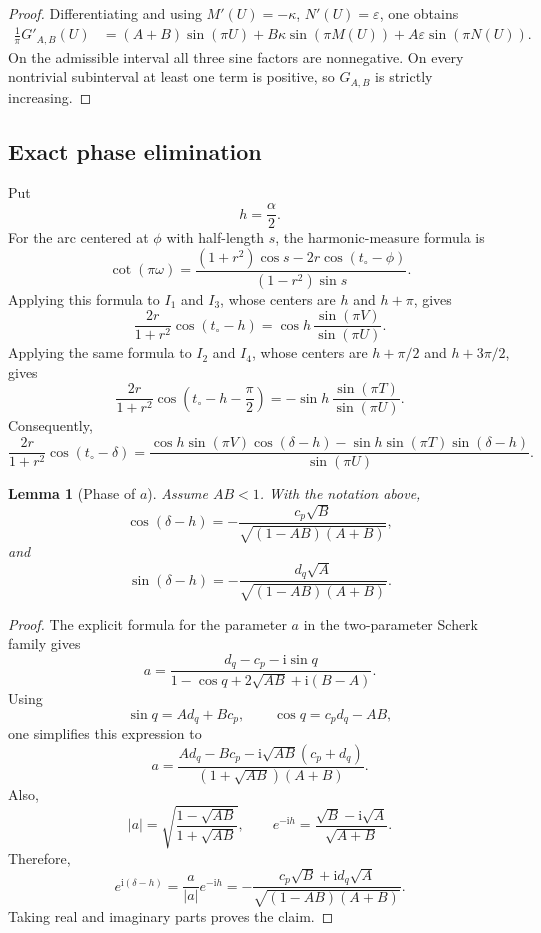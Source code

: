 \documentclass[11pt]{amsart}
\newtheorem{lemma}[theorem]{Lemma}
\theoremstyle{remark}
\newcommand{\ii}{\mathrm i}
\newcommand{\eps}{\varepsilon}
\numberwithin{equation}{section}
\begin{document}
\begin{proof}
Differentiating and using $M'(U)=-\kappa$, $N'(U)=\eps$, one obtains
\[
\begin{aligned}
        \frac1\pi G'_{A,B}(U)
        &=(A+B)\sin(\pi U)
        +B\kappa\sin(\pi M(U))
        +A\eps\sin(\pi N(U)).
\end{aligned}
\]
On the admissible interval all three sine factors are nonnegative. On every nontrivial subinterval at least one term is positive, so $G_{A,B}$ is strictly increasing.
\end{proof}

\subsection{Exact phase elimination}

Put
\[
        h=\frac{\alpha}{2}.
\]
For the arc centered at $\phi$ with half-length $s$, the harmonic-measure formula is
\[
        \cot(\pi\omega)
        =\frac{(1+r^2)\cos s-2r\cos(t_\circ-\phi)}{(1-r^2)\sin s}.
\]
Applying this formula to $I_1$ and $I_3$, whose centers are $h$ and $h+\pi$, gives
\[
        \frac{2r}{1+r^2}\cos(t_\circ-h)
        =\cos h\,\frac{\sin(\pi V)}{\sin(\pi U)}.
\]
Applying the same formula to $I_2$ and $I_4$, whose centers are $h+\pi/2$ and $h+3\pi/2$, gives
\[
        \frac{2r}{1+r^2}\cos\left(t_\circ-h-\frac\pi2\right)
        =-\sin h\,\frac{\sin(\pi T)}{\sin(\pi U)}.
\]
Consequently,
\[
\frac{2r}{1+r^2}\cos(t_\circ-\delta)
=
\frac{
\cos h\sin(\pi V)\cos(\delta-h)-
\sin h\sin(\pi T)\sin(\delta-h)}{\sin(\pi U)}.
\]

\begin{lemma}[Phase of $a$]\label{lem:phase-a}
Assume $AB<1$. With the notation above,
\[
        \cos(\delta-h)
        =-
        \frac{c_p\sqrt B}{\sqrt{(1-AB)(A+B)}},
\]
and
\[
        \sin(\delta-h)
        =-
        \frac{d_q\sqrt A}{\sqrt{(1-AB)(A+B)}}.
\]
\end{lemma}

\begin{proof}
The explicit formula for the parameter $a$ in the two-parameter Scherk family gives
\[
        a=\frac{d_q-c_p-\ii\sin q}{1-
        \cos q+2\sqrt{AB}+\ii(B-A)}.
\]
Using
\[
        \sin q=Ad_q+Bc_p,
        \qquad
        \cos q=c_pd_q-AB,
\]
one simplifies this expression to
\[
        a=\frac{Ad_q-Bc_p-
        \ii\sqrt{AB}(c_p+d_q)}{(1+
        \sqrt{AB})(A+B)}.
\]
Also,
\[
        |a|=\sqrt{\frac{1-
        \sqrt{AB}}{1+
        \sqrt{AB}}},
        \qquad
        e^{-\ii h}=\frac{\sqrt B-
        \ii\sqrt A}{\sqrt{A+B}}.
\]
Therefore,
\[
        e^{\ii(\delta-h)}
        =\frac{a}{|a|}e^{-\ii h}
        =-
        \frac{c_p\sqrt B+
        \ii d_q\sqrt A}{\sqrt{(1-AB)(A+B)}}.
\]
Taking real and imaginary parts proves the claim.
\end{proof}
\end{document}
